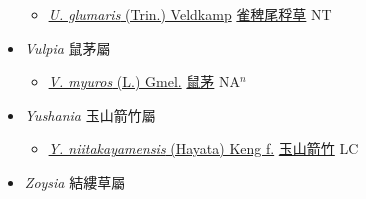 \begin{itemize}
  \begin{itemize}
        \item[] \href{http://www.theplantlist.org/tpl1.1/search?q=Urochloa+glumaris}{\textit{U. glumaris} (Trin.) Veldkamp}   \href{\detokenize{http://taibnet.sinica.edu.tw/chi/taibnet_species_list.php?T2=雀稗尾稃草&T2_new_value=true&fr=y}}{雀稗尾稃草} NT
  \end{itemize}
 \item[] \textit{Vulpia} 鼠茅屬
                    
  \begin{itemize}
        \item[] \href{http://www.theplantlist.org/tpl1.1/search?q=Vulpia+myuros}{\textit{V. myuros} (L.) Gmel.}   \href{\detokenize{http://taibnet.sinica.edu.tw/chi/taibnet_species_list.php?T2=鼠茅&T2_new_value=true&fr=y}}{鼠茅} NA$^n$
  \end{itemize}
 \item[] \textit{Yushania} 玉山箭竹屬
                    
  \begin{itemize}
        \item[] \href{http://www.theplantlist.org/tpl1.1/search?q=Yushania+niitakayamensis}{\textit{Y. niitakayamensis} (Hayata) Keng f.}   \href{\detokenize{http://taibnet.sinica.edu.tw/chi/taibnet_species_list.php?T2=玉山箭竹&T2_new_value=true&fr=y}}{玉山箭竹} LC
  \end{itemize}
 \item[] \textit{Zoysia} 結縷草屬
                    

\end{itemize}
